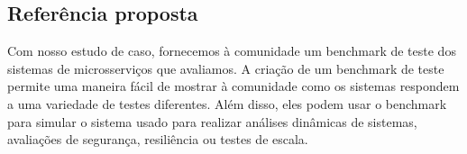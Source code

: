 \begin{tabela}[h]
\begin{tabela}[!t]
\begin{tabela}[h]
\begin{tabela}[h]



\section{Referência proposta}
\label{sec:proposto}


Com nosso estudo de caso, fornecemos à comunidade um benchmark de teste dos sistemas de microsserviços que avaliamos. A criação de um benchmark de teste permite uma maneira fácil de mostrar à comunidade como os sistemas respondem a uma variedade de testes diferentes. Além disso, eles podem usar o benchmark para simular o sistema usado para realizar análises dinâmicas de sistemas, avaliações de segurança, resiliência ou testes de escala.


\end{tabela}
\end{tabela}
\end{tabela}
\end{tabela}
